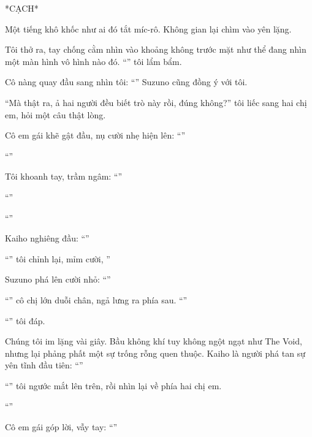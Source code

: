 \documentclass[../main.tex]{subfiles}
\begin{document}
*CẠCH*

Một tiếng khô khốc như ai đó tắt míc-rô. Không gian lại chìm vào yên lặng.

Tôi thở ra, tay chống cằm nhìn vào khoảng không trước mặt như thể đang nhìn một màn hình vô hình nào đó. ``'' tôi lẩm bẩm.

Cô nàng quay đầu sang nhìn tôi: ``'' Suzuno cũng đồng ý với tôi.

``Mà thật ra, ả hai người đều biết trò này rồi, đúng không?'' tôi liếc sang hai chị em, hỏi một câu thật lòng.

Cô em gái khẽ gật đầu, nụ cười nhẹ hiện lên: ``''

``''

Tôi khoanh tay, trầm ngâm: ``''

``''

``''

Kaiho nghiêng đầu: ``''

``'' tôi chỉnh lại, mỉm cười, ''

Suzuno phá lên cười nhỏ: ``''

``'' cô chị lớn duỗi chân, ngả lưng ra phía sau. ``''

``'' tôi đáp.

Chúng tôi im lặng vài giây. Bầu không khí tuy không ngột ngạt như The Void, nhưng lại phảng phất một sự trống rỗng quen thuộc. Kaiho là người phá tan sự yên tĩnh đầu tiên: ``''

``'' tôi ngước mắt lên trên, rồi nhìn lại về phía hai chị em.

``''

Cô em gái góp lời, vẫy tay: ``''
\end{document}
